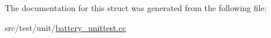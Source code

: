 The documentation for this struct was generated from the following file\+:\begin{DoxyCompactItemize}
\item 
src/test/unit/\hyperlink{battery__unittest_8cc}{battery\+\_\+unittest.\+cc}\end{DoxyCompactItemize}
